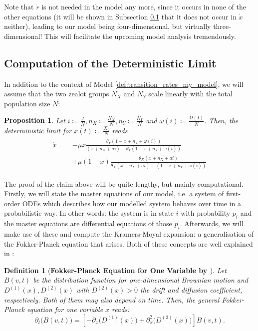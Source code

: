 \documentclass[12pt,a4paper,twoside]{article}
\newtheorem{definition}{Definition}[section]
\newtheorem{prop}{Proposition}[section]
\begin{document}
Note that $\dot{r}$ is not needed in the model any more, since it occurs in none of the other equations (it will be shown in Subsection \ref{subsec:det_lim_comp} that it does not occur in $\dot{x}$ neither), leading to our model being four-dimensional, but virtually three-dimensional! This will facilitate the upcoming model analysis tremendously. 

\subsection{Computation of the Deterministic Limit}\label{subsec:det_lim_comp}
In addition to the context of Model \ref{def:transition_rates_my_model}, we will assume that the two zealot groups $N_X$ and $N_Y$ scale linearly with the total population size $N$:

\begin{prop}\label{prop:det_limit_my_model_main}
	Let $i \coloneqq \frac{I}{N}, n_X \coloneqq \frac{N_X}{N}, n_Y \coloneqq \frac{N_Y}{N}$ and $\omega\left(i\right)\coloneqq \frac{\Omega\left(I\right)}{N}$. Then, the deterministic limit for $x\left(t\right) \coloneqq \frac{X_t}{N}$ reads
	\begin{align}\label{prop:det_limit_my_model}
	\begin{split}
	\dot{x} = &-\mu x\frac{\theta_Y(1-x+n_Y+\omega\left(i\right))}{(x+n_X+ai) + \theta_Y(1-x+n_Y+\omega\left(i\right))}\\
	\qquad&+ \mu \left(1-x\right)\frac{\theta_X (x+ n_X+ ai)}{\theta_X (x + n_X + ai) + (1-x + n_Y + \omega\left(i\right))}
	\end{split}
	\end{align}
\end{prop}

The proof of the claim above will be quite lengthy, but mainly computational. Firstly, we will state the master equations of our model, i.e. a system of first-order \acp{ODE} which describes how our modelled system behaves over time in a probabilistic way. In other words: the system is in state $i$ with probability $p_i$ and the master equations are differential equations of those $p_i$. Afterwards, we will make use of these and compute the Kramers-Moyal expansion: a generalisation of the Fokker-Planck equation that arises. Both of these concepts are well explained in \cite{Risken1989}:

\begin{definition}[\textbf{Fokker-Planck Equation for One Variable by \cite{Risken1989}}]
	Let $B\left(v,t\right)$ be the distribution function for one-dimensional Brownian motion and $D^{(1)}(x),D^{(2)}(x)$ with $D^{(2)}(x) > 0$ the drift and diffusion coefficient, respectively. Both of them may also depend on time. Then, the general Fokker-Planck equation for one variable $x$ reads:
	\begin{equation*}
		\partial_t\big(B\left(v,t\right)\big) = \left[-\partial_x\big(D^{(1)}(x)\big) + \partial_x^2\big(D^{(2)}(x)\big)\right] B\left(v,t\right).
	\end{equation*}
\end{definition}
\end{document}
